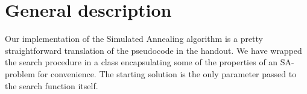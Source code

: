 \section*{General description}

Our implementation of the Simulated Annealing algorithm is a pretty straightforward translation of the pseudocode in the handout.
We have wrapped the search procedure in a class encapsulating some of the properties of an SA-problem for convenience.
The starting solution is the only parameter passed to the search function itself.




